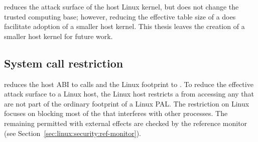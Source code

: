 
\graphene{} reduces the attack surface of the host Linux kernel, but does not change the trusted computing base; however, reducing the effective \linuxapi{} table size of a \picoproc{} does facilitate adoption of a smaller host kernel.
This thesis leaves the creation of a smaller host kernel for future work.

\subsection{System call restriction}
\label{sec:linux:security:syscall-restriction}


\graphene{} reduces the host ABI to \palcallnum{} calls
and the Linux \linuxapi{} footprint to \hostsyscallnum{} \linuxapis{}.
To reduce the effective attack surface to a Linux host,
the Linux host restricts a \picoproc{} from accessing any \linuxapis{} that are not part of the ordinary footprint of a Linux PAL.
The \linuxapi{} restriction on Linux focuses on blocking most of the \linuxapis{}
that interferes with other processes.
The remaining permitted \linuxapis{} with external effects are checked by 
the reference monitor (see Section~\ref{sec:linux:security:ref-monitor}).
 







